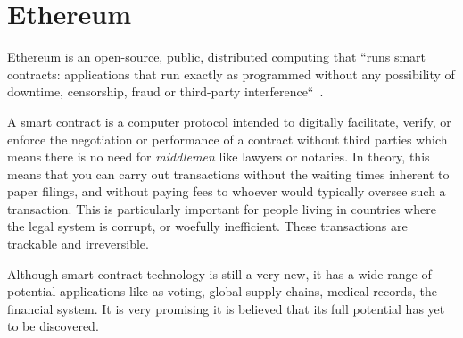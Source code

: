 \section{Ethereum}

Ethereum is an open-source, public, 
distributed computing that ``runs
smart contracts: applications that 
run exactly as programmed without
any possibility of downtime, censorship, 
fraud or third-party
interference``~\cite{hid-sp18-506-EthereumOrg}.

A smart contract is a computer protocol 
intended to digitally
facilitate, verify, or enforce the 
negotiation or performance of a
contract without third parties which 
means there is no need for
\emph{middlemen} like lawyers or 
notaries. In theory, this means that
you can carry out transactions 
without the waiting times inherent to
paper filings, and without paying 
fees to whoever would typically
oversee such a transaction. 
This is particularly important 
for people living in countries 
where the legal system is corrupt, 
or woefully inefficient. 
These transactions are trackable and irreversible.

Although smart contract technology 
is still a very new, it has a wide
range of potential applications 
like as voting, global supply chains,
medical records, the financial system. 
It is very promising it is
believed that its full potential 
has yet to be discovered.